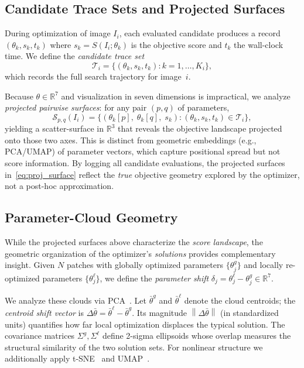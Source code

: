 \documentclass[11pt,a4paper]{article}
\newcommand{\R}{\mathbb{R}}
\newcommand{\norm}[1]{\left\lVert #1 \right\rVert}
\begin{document}
\subsection{Candidate Trace Sets and Projected Surfaces}
\label{sec:trace_surfaces}
During optimization of image $I_i$, each evaluated candidate produces a record $({\theta}_k, s_k, t_k)$ where $s_k = S(I_i; {\theta}_k)$ is the objective score and $t_k$ the wall-clock time.
We define the \emph{candidate trace set}
\begin{equation}
\mathcal{T}_i = \bigl\{({\theta}_k, s_k, t_k) : k = 1, \dots, K_i\bigr\},
\label{eq:trace_set}
\end{equation}
which records the full search trajectory for image~$i$.

Because $\theta\in\R^7$ and visualization in seven dimensions is impractical, we analyze \emph{projected pairwise surfaces}: for any pair $(p,q)$ of parameters,
\begin{equation}
\mathcal{S}_{p,q}(I_i) = \bigl\{(\theta_k[p],\; \theta_k[q],\; s_k) : (\theta_k, s_k, t_k) \in \mathcal{T}_i \bigr\},
\label{eq:proj_surface}
\end{equation}
yielding a scatter-surface in $\R^3$ that reveals the objective landscape projected onto those two axes. This is distinct from geometric embeddings (e.g., PCA/UMAP) of parameter vectors, which capture positional spread but not score information. By logging all candidate evaluations, the projected surfaces in~\eqref{eq:proj_surface} reflect the \emph{true} objective geometry explored by the optimizer, not a post-hoc approximation.

\subsection{Parameter-Cloud Geometry}
\label{sec:param_geometry_math}
While the projected surfaces above characterize the \emph{score landscape}, the geometric organization of the optimizer's \emph{solutions} provides complementary insight. Given $N$ patches with globally optimized parameters $\{\theta_j^g\}$ and locally re-optimized parameters $\{\theta_j^\ell\}$, we define the \emph{parameter shift} $\delta_j = \theta_j^\ell - \theta_j^g \in \R^7$.

We analyze these clouds via PCA~\citep{jolliffe2016pca}. Let $\bar\theta^g$ and $\bar\theta^\ell$ denote the cloud centroids; the \emph{centroid shift vector} is $\Delta\bar\theta = \bar\theta^\ell - \bar\theta^g$. Its magnitude $\norm{\Delta\bar\theta}$ (in standardized units) quantifies how far local optimization displaces the typical solution. The covariance matrices $\Sigma^g, \Sigma^\ell$ define 2-sigma ellipsoids whose overlap measures the structural similarity of the two solution sets. For nonlinear structure we additionally apply t-SNE~\citep{vandermaaten2008tsne} and UMAP~\citep{mcinnes2018umap}.
\end{document}
